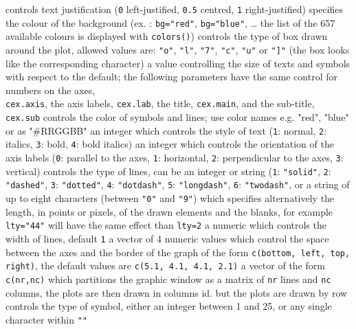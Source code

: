 	{controls text justification ({\tt 0} left-justified, {\tt 0.5} centred, {\tt 1} right-justified)}
	{specifies the colour of the background (ex. : {\tt bg="red"}, {\tt bg="blue"}, \ldots{} the list of the 657 available colours is displayed with {\tt colors()})}
	{controls the type of box drawn around the plot, allowed values
    are: {\tt "o"}, {\tt "l"}, {\tt "7"}, {\tt "c"}, {\tt "u"} or {\tt "]"} (the box looks like the corresponding character)}
	{ a value controlling the size of texts and symbols with respect to the default; the following parameters have the same control for numbers on the axes,\\
    {\tt cex.axis}, the axis labels, {\tt cex.lab}, the title, {\tt cex.main},
    and the sub-title, {\tt cex.sub}}
	{controls the color of symbols and lines; use color names e.g. "red", "blue" or as "\#RRGGBB"}
	{an integer which controls the style of text ({\tt 1}: normal, {\tt 2}: italics, {\tt 3}: bold, {\tt 4}: bold italics)}
	{ an integer which controls the orientation of the axis labels ({\tt 0}: parallel to the axes, {\tt 1}: horizontal, {\tt 2}: perpendicular to the axes, {\tt 3}: vertical)}
	{controls the type of lines, can be an integer or string ({\tt 1}: {\tt "solid"}, {\tt 2}: {\tt "dashed"}, {\tt 3}: {\tt "dotted"}, {\tt 4}: {\tt "dotdash"}, {\tt 5}: {\tt "longdash"}, {\tt 6}: {\tt "twodash"}, or a string of up to eight characters (between {\tt "0"} and {\tt "9"}) which specifies alternatively the length, in points or pixels, of the drawn elements and the blanks, for example {\tt lty="44"} will have the same effect than {\tt lty=2}}
	{ a numeric which controls the width of lines, default {\tt 1}}
	{ a vector of 4 numeric values which control the space between the axes and the border of the graph of the form {\tt c(bottom, left, top, right)}, the default values are {\tt c(5.1, 4.1, 4.1, 2.1)}}
	{a vector of the form {\tt c(nr,nc)} which partitions the graphic window as a matrix of {\tt nr} lines and {\tt nc} columns, the plots are then drawn in columns}
	{ id. but the plots are drawn by row}
	{ controls the type of symbol, either an integer between 1 and 25, or any single character within {\tt ""}}

